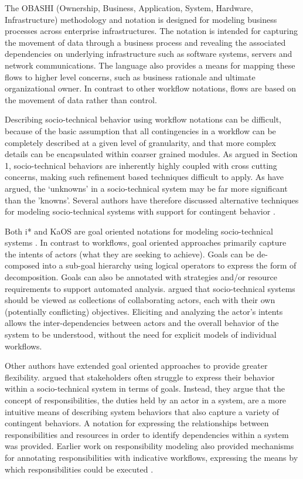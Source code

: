 \documentclass{llncs}
\begin{document}
The OBASHI (Ownership, Business, Application, System, Hardware, Infrastructure) methodology and notation
\cite{obashimethodology} is designed for modeling business processes across enterprise infrastructures.  The notation is
intended for capturing the movement of data through a business process and revealing the associated dependencies on
underlying infrastructure such as software systems, servers and network communications.  The language also provides a
means for mapping these flows to higher level concerns, such as business rationale and ultimate organizational owner. In
contrast to other workflow notations, flows are based on the movement of data rather than control.

Describing socio-technical behavior using workflow notations can be difficult, because of the basic assumption that all
contingencies in a workflow can be completely described at a given level of granularity, and that more complex details
can be encapsulated within coarser grained modules.  As argued in Section 1, socio-technical behaviors are inherently
highly coupled with cross cutting concerns, making such refinement based techniques difficult to apply.  As
\citet{israilidis13ignorance} have argued, the `unknowns' in a socio-technical system may be far more significant than
the 'knowns'. Several authors have therefore discussed alternative techniques for modeling socio-technical systems with
support for contingent behavior \cite{dardenne93goal,sommerville09deriving,voinov13integronsters,yu1995social}.

Both i* \cite{yu1995social} and KaOS \cite{dardenne93goal} are goal oriented notations for modeling socio-technical systems
\cite{werneck2009goreistarkaos}.  In contrast to workflows, goal oriented approaches primarily capture the intents of actors (what
  they are seeking to achieve).  Goals can be de-composed into a sub-goal hierarchy using logical operators to express
the form of decomposition. Goals can also be annotated with strategies and/or resource requirements to support automated
analysis.  \citet{yu1995social} argued that socio-technical systems should be viewed as collections of collaborating actors,
each with their own (potentially conflicting) objectives.  Eliciting and analyzing the actor’s intents allows the
inter-dependencies between actors and the overall behavior of the system to be understood, without the need for explicit
models of individual workflows.

Other authors have extended goal oriented approaches to provide greater flexibility. \citet{sommerville09deriving}
argued that stakeholders often struggle to express their behavior within a socio-technical system in terms of goals.
Instead, they argue that the concept of responsibilities, the duties held by an actor in a system, are a more intuitive
means of describing system behaviors that also capture a variety of contingent behaviors.  A notation for expressing the
relationships between responsibilities and resources in order to identify dependencies within a system was provided.
Earlier work on responsibility modeling also provided mechanisms for annotating responsibilities with indicative
workflows, expressing the means by which responsibilities could be executed \citep{dewsbury07responsibility}.
\end{document}
